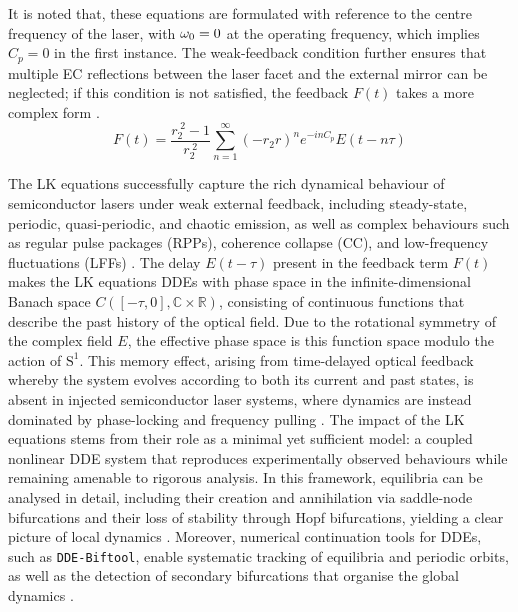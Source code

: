 It is noted that, these equations are formulated with reference to the centre frequency of the laser, with $\omega_0 = 0$ at the operating frequency, which implies $C_p = 0$ in the first instance. 
The weak-feedback condition further ensures that multiple EC reflections between the laser facet and the external mirror can be neglected; if this condition is not satisfied, the feedback $F(t)$ takes a more complex form \cite{vantartwijk1995semiconductor}.
%
\begin{equation}
\label{eq:multiple_EC}
    F(t) = \frac{r_2^{\;2} - 1}{r_2^{\;2}} \sum_{n=1}^\infty (-r_2 r)^n e^{-i n C_p} E(t-n \tau)
\end{equation}
%
\par
%
The LK equations successfully capture the rich dynamical behaviour of semiconductor lasers under weak external feedback, including steady-state, periodic, quasi-periodic, and chaotic emission, as well as complex behaviours such as regular pulse packages (RPPs), coherence collapse (CC), and low-frequency fluctuations (LFFs) \cite{heil1998coexistence}.
The delay $E(t-\tau)$ present in the feedback term $F(t)$ makes the LK equations DDEs with phase space in the infinite-dimensional Banach space $C([-\tau,0],\mathbb{C}\times\mathbb{R})$, consisting of continuous functions that describe the past history of the optical field.
Due to the rotational symmetry of the complex field $E$, the effective phase space is this function space modulo the action of $\mathrm{S}^1$.
This memory effect, arising from time-delayed optical feedback whereby the system evolves according to both its current and past states, is absent in injected semiconductor laser systems, where dynamics are instead dominated by phase-locking and frequency pulling \cite{wieczorek1999unifying,wieczorek2005dynamical}.
The impact of the LK equations stems from their role as a minimal yet sufficient model: a coupled nonlinear DDE system that reproduces experimentally observed behaviours while remaining amenable to rigorous analysis.
In this framework, equilibria can be analysed in detail, including their creation and annihilation via saddle-node bifurcations and their loss of stability through Hopf bifurcations, yielding a clear picture of local dynamics \cite{rottschafer2007ecm}.
Moreover, numerical continuation tools for DDEs, such as \texttt{DDE-Biftool}, enable systematic tracking of equilibria and periodic orbits, as well as the detection of secondary bifurcations that organise the global dynamics \cite{sieber2014dde, krauskopf2004dynamics}.
%
\par
